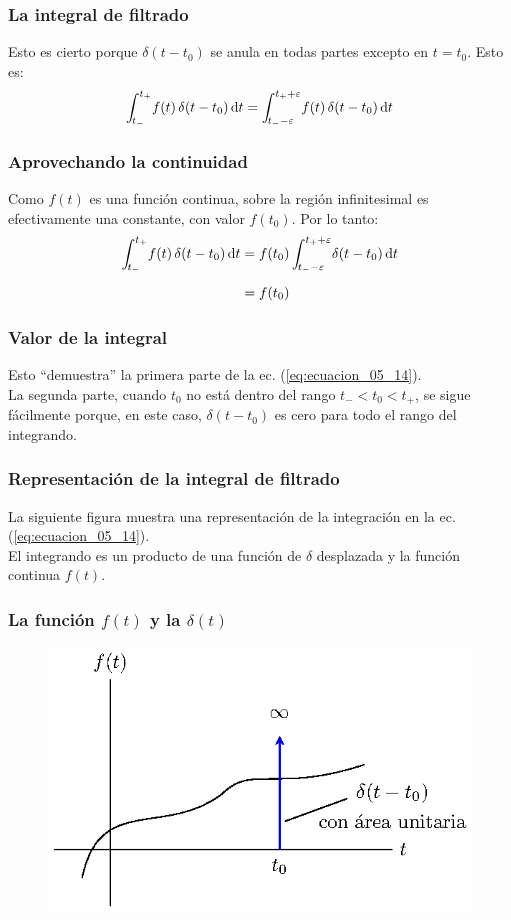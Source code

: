 \documentclass[12pt]{beamer}
\begin{document}
\begin{frame}
\frametitle{La integral de filtrado}
Esto es cierto porque $\delta (t - t_{0})$ se anula en todas partes excepto en $t = t_{0}$. Esto es:
\pause
\begin{align}
\scaleint{5ex}_{\bs t_{-}}^{t_{+}} f(t) \, \delta (t - t_{0}) \dd{t} = \scaleint{5ex}_{\bs t_{-} - \varepsilon}^{t_{+} + \varepsilon} f(t) \, \delta (t - t_{0}) \dd{t} 
\label{eq:ecuacion_05_15}
\end{align}
\end{frame}
\begin{frame}
\frametitle{Aprovechando la continuidad}
Como $f (t)$ es una función continua, sobre la región infinitesimal es efectivamente una constante, con valor $f(t_{0})$. Por lo tanto:
\pause
\begin{align}
\begin{aligned}[b]
\scaleint{5ex}_{\bs t_{-}}^{t_{+}} f(t) \, \delta (t - t_{0}) \dd{t} &= f(t_{0}) \, \scaleint{5ex}_{\bs t_{-} - \varepsilon}^{t_{+} + \varepsilon} \delta (t - t_{0}) \dd{t} \\[0.5em]
&= f(t_{0})
\end{aligned}
\label{eq:ecuacion_05_16}
\end{align}
\end{frame}
\begin{frame}
\frametitle{Valor de la integral}
Esto \enquote{demuestra} la primera parte de la ec. (\ref{eq:ecuacion_05_14}).
\\
\bigskip
\pause
La segunda parte, cuando $t_{0}$  no está dentro del rango $t_{-} < t_{0}  < t_{+}$, se sigue fácilmente porque, en este caso, $\delta (t - t_{0})$ es cero para todo el rango del integrando.
\end{frame}
\begin{frame}
\frametitle{Representación de la integral de filtrado}
La siguiente figura muestra una representación de la integración en la ec. (\ref{eq:ecuacion_05_14}).
\\
\bigskip
\pause
El integrando es un producto de una función de $\delta$ desplazada y la función continua $f (t)$.
\end{frame}
\begin{frame}
\frametitle{La función $f(t)$ y la $\delta(t)$}
\begin{figure}
    \centering
    \includegraphics[scale=1]{Imagenes/plot_propiedad_desplazamiento_02.eps}
\end{figure}
\end{frame}
\end{document}
